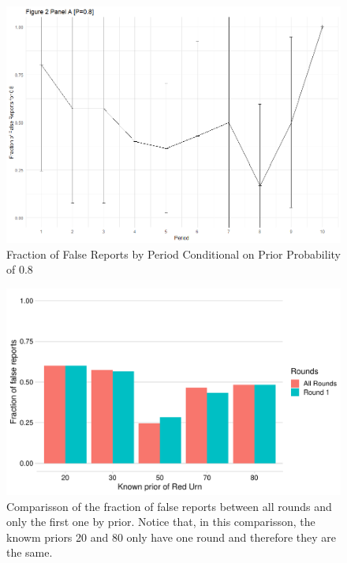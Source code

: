 \documentclass[12pt,a4paper]{article}
\begin{document}
	\begin{figure}
		\centering
		\includegraphics[scale=0.4]{../../results/2a_80.png}
		\caption{Fraction of False Reports by Period Conditional on Prior Probability of 0.8} \label{tab:F6}
		\label{fig:enter-label}
	\end{figure}
	
	
	\newpage
	
	\begin{figure}
		\centering
		\includegraphics[scale=0.75]{../../results/fig2B_round_one.pdf}
		\caption{Comparisson of the fraction of false reports between all rounds and only the first one by prior. Notice that, in this comparisson, the knowm priors 20 and 80 only have one round and therefore they are the same.}
		\label{fig:fig2a_rounds}
	\end{figure}
\end{document}
